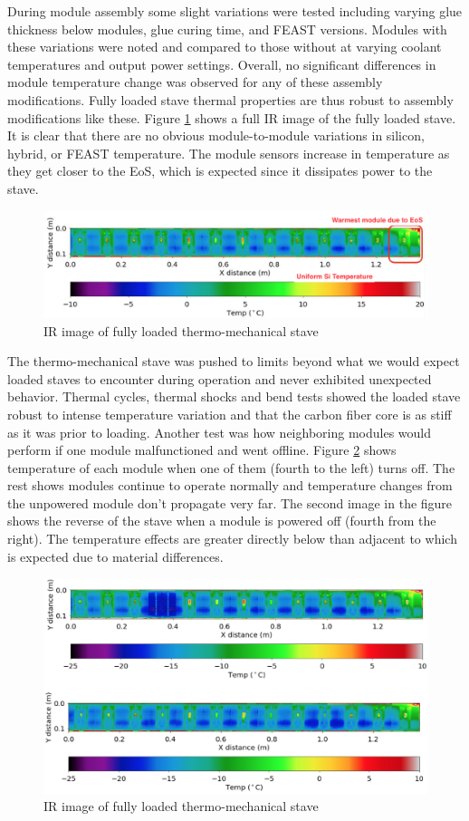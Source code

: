 During module assembly some slight variations were tested including varying glue thickness below modules, glue curing time, and FEAST versions. Modules with these variations were noted and compared to those without at varying coolant temperatures and output power settings. Overall, no significant differences in module temperature change was observed for any of these assembly modifications. Fully loaded stave thermal properties are thus robust to assembly modifications like these. Figure \ref{fig:IRimagetotal} shows a full IR image of the fully loaded stave. It is clear that there are no obvious module-to-module variations in silicon, hybrid, or FEAST temperature. The module sensors increase in temperature as they get closer to the EoS, which is expected since it dissipates power to the stave.

\begin{figure}[!h]
        \centering
    \includegraphics[width=.8\textwidth]{Pictures/IRimagetotal.png}
    \caption{IR image of fully loaded thermo-mechanical stave}
    \label{fig:IRimagetotal}
\end{figure} 
 
The thermo-mechanical stave was pushed to limits beyond what we would expect loaded staves to encounter during operation and never exhibited unexpected behavior. Thermal cycles, thermal shocks and bend tests showed the loaded stave robust to intense temperature variation and that the carbon fiber core is as stiff as it was prior to loading. Another test was how neighboring modules would perform if one module malfunctioned and went offline. Figure \ref{fig:moduleoff} shows temperature of each module when one of them (fourth to the left) turns off. The rest shows modules continue to operate normally and temperature changes from the unpowered module don't propagate very far. The second image in the figure shows the reverse of the stave when a module is powered off (fourth from the right). The temperature effects are greater directly below than adjacent to which is expected due to material differences. 

\begin{figure}[!h]
        \centering
    \includegraphics[width=.7\textwidth]{Pictures/moduleoff.png}
    \caption{IR image of fully loaded thermo-mechanical stave}
    \label{fig:moduleoff}
\end{figure}

